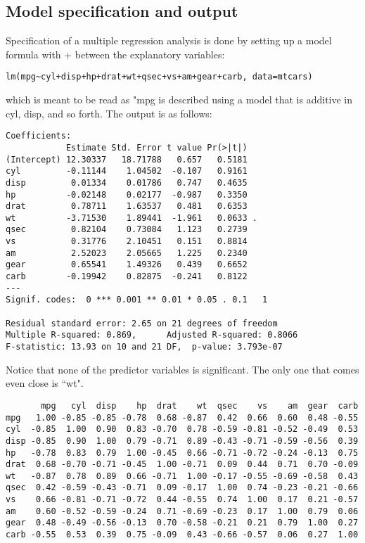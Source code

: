 \subsection{Model specification and output}
Specification of a multiple regression analysis is done by setting up a
model formula with + between the explanatory variables:
\begin{verbatim}
lm(mpg~cyl+disp+hp+drat+wt+qsec+vs+am+gear+carb, data=mtcars)
\end{verbatim}

which is meant to be read as "mpg is described using a model that
is additive in cyl, disp, and so forth. The output is as follows:
\footnotesize
\begin{verbatim}
Coefficients:
            Estimate Std. Error t value Pr(>|t|)
(Intercept) 12.30337   18.71788   0.657   0.5181
cyl         -0.11144    1.04502  -0.107   0.9161
disp         0.01334    0.01786   0.747   0.4635
hp          -0.02148    0.02177  -0.987   0.3350
drat         0.78711    1.63537   0.481   0.6353
wt          -3.71530    1.89441  -1.961   0.0633 .
qsec         0.82104    0.73084   1.123   0.2739
vs           0.31776    2.10451   0.151   0.8814
am           2.52023    2.05665   1.225   0.2340
gear         0.65541    1.49326   0.439   0.6652
carb        -0.19942    0.82875  -0.241   0.8122
---
Signif. codes:  0 *** 0.001 ** 0.01 * 0.05 . 0.1   1

Residual standard error: 2.65 on 21 degrees of freedom
Multiple R-squared: 0.869,      Adjusted R-squared: 0.8066
F-statistic: 13.93 on 10 and 21 DF,  p-value: 3.793e-07
\end{verbatim}
\normalsize
Notice that none of the predictor variables is significant. The only one that comes even close is ``wt".

\footnotesize
\begin{verbatim}
       mpg   cyl  disp    hp  drat    wt  qsec    vs    am  gear  carb
mpg   1.00 -0.85 -0.85 -0.78  0.68 -0.87  0.42  0.66  0.60  0.48 -0.55
cyl  -0.85  1.00  0.90  0.83 -0.70  0.78 -0.59 -0.81 -0.52 -0.49  0.53
disp -0.85  0.90  1.00  0.79 -0.71  0.89 -0.43 -0.71 -0.59 -0.56  0.39
hp   -0.78  0.83  0.79  1.00 -0.45  0.66 -0.71 -0.72 -0.24 -0.13  0.75
drat  0.68 -0.70 -0.71 -0.45  1.00 -0.71  0.09  0.44  0.71  0.70 -0.09
wt   -0.87  0.78  0.89  0.66 -0.71  1.00 -0.17 -0.55 -0.69 -0.58  0.43
qsec  0.42 -0.59 -0.43 -0.71  0.09 -0.17  1.00  0.74 -0.23 -0.21 -0.66
vs    0.66 -0.81 -0.71 -0.72  0.44 -0.55  0.74  1.00  0.17  0.21 -0.57
am    0.60 -0.52 -0.59 -0.24  0.71 -0.69 -0.23  0.17  1.00  0.79  0.06
gear  0.48 -0.49 -0.56 -0.13  0.70 -0.58 -0.21  0.21  0.79  1.00  0.27
carb -0.55  0.53  0.39  0.75 -0.09  0.43 -0.66 -0.57  0.06  0.27  1.00
\end{verbatim}
\normalsize


